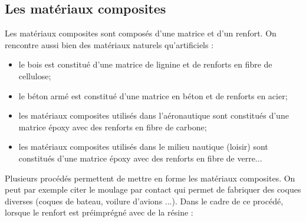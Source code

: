 \documentclass[11pt,oneside]{article}
\begin{document}
\subsection{Les matériaux composites}

Les matériaux composites sont composés d'une matrice et d'un renfort. On rencontre aussi bien des matériaux naturels qu'artificiels : 

\begin{itemize}
\item le bois est constitué d'une matrice de lignine et de renforts en fibre de cellulose;
\item le béton armé est constitué d'une matrice en béton et de renforts en acier;
\item les matériaux composites utilisés dans l'aéronautique sont constitués d'une matrice époxy avec des renforts en fibre de carbone;
\item les matériaux composites utilisés dans le milieu nautique (loisir) sont constitués d'une matrice époxy avec des renforts en fibre de verre...
\end{itemize}

Plusieurs procédés permettent de mettre en forme les matériaux composites. On peut par exemple citer le moulage par contact qui permet de fabriquer des coques diverses (coques de bateau, voilure d'avions ...). Dans le cadre de ce procédé, lorsque le renfort est préimprégné avec de la résine :
\end{document}
